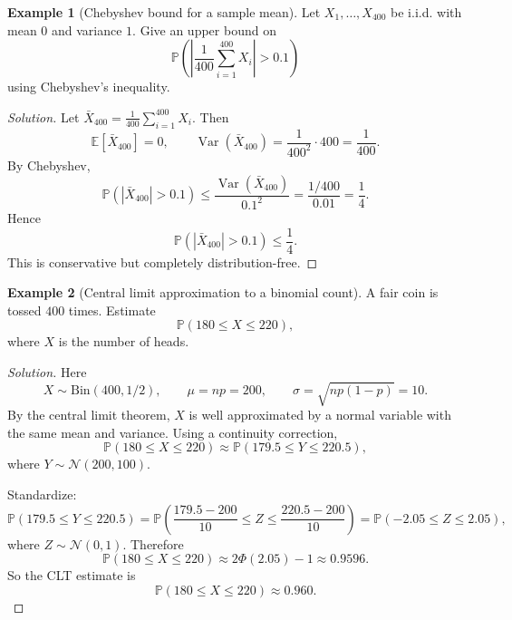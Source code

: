 \documentclass[11pt]{article}
\theoremstyle{definition}
\newtheorem{example}{Example}[section]
\newcommand{\E}{\mathbb{E}}
\newcommand{\Var}{\operatorname{Var}}
\begin{document}
\begin{center}
\end{center}

\begin{example}[Chebyshev bound for a sample mean]
Let $X_1,\dots,X_{400}$ be i.i.d. with mean $0$ and variance $1$. Give an upper bound on
\[
\mathbb{P}\left(\left|\frac{1}{400}\sum_{i=1}^{400}X_i\right|>0.1\right)
\]
using Chebyshev's inequality.
\end{example}

\begin{proof}[Solution]
Let $\bar X_{400}=\frac{1}{400}\sum_{i=1}^{400}X_i$. Then
\[
\E[\bar X_{400}]=0, \qquad \Var(\bar X_{400})=\frac{1}{400^2}\cdot 400 = \frac{1}{400}.
\]
By Chebyshev,
\[
\mathbb{P}(|\bar X_{400}|>0.1) \le \frac{\Var(\bar X_{400})}{0.1^2} = \frac{1/400}{0.01} = \frac14.
\]
Hence
\[
\boxed{\mathbb{P}(|\bar X_{400}|>0.1)\le \frac14}.
\]
This is conservative but completely distribution-free.
\end{proof}

\begin{example}[Central limit approximation to a binomial count]
A fair coin is tossed $400$ times. Estimate
\[
\mathbb{P}(180\le X\le 220),
\]
where $X$ is the number of heads.
\end{example}

\begin{proof}[Solution]
Here
\[
X\sim \mathrm{Bin}(400,1/2),
\qquad
\mu=np=200,
\qquad
\sigma=\sqrt{np(1-p)}=10.
\]
By the central limit theorem, $X$ is well approximated by a normal variable with the same mean and variance. Using a continuity correction,
\[
\mathbb{P}(180\le X\le 220)
\approx
\mathbb{P}(179.5\le Y\le 220.5),
\]
where $Y\sim \mathcal{N}(200,100)$.

Standardize:
\[
\mathbb{P}(179.5\le Y\le 220.5)
=
\mathbb{P}\left(\frac{179.5-200}{10}\le Z\le \frac{220.5-200}{10}\right)
=
\mathbb{P}(-2.05\le Z\le 2.05),
\]
where $Z\sim \mathcal{N}(0,1)$.
Therefore
\[
\mathbb{P}(180\le X\le 220)
\approx 2\Phi(2.05)-1
\approx 0.9596.
\]
So the CLT estimate is
\[
\boxed{\mathbb{P}(180\le X\le 220)\approx 0.960.}
\]
\end{proof}
\end{document}
